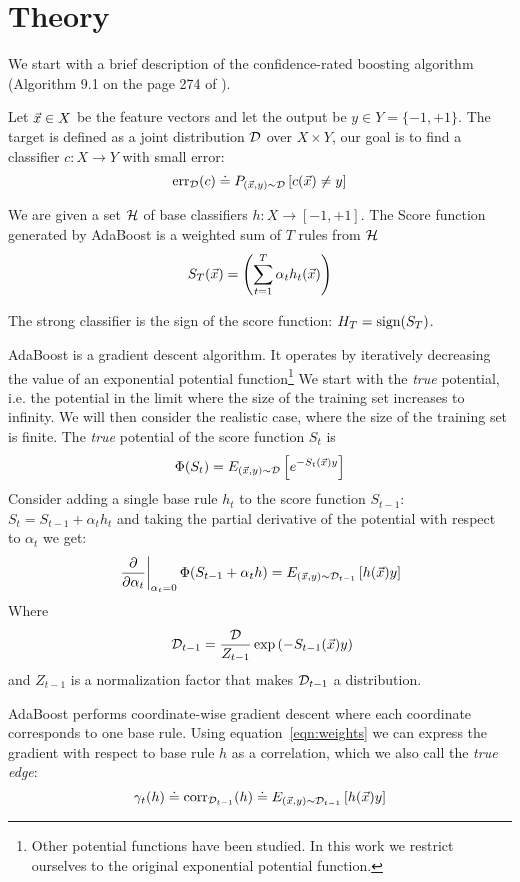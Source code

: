 \section{Theory}\label{sec:theory}
We start with a brief description of the confidence-rated boosting
algorithm (Algorithm 9.1 on the page 274 of \cite{schapire_boosting:_2012}).

Let $\vec{x} \in X$ be the feature vectors and let the output be $y \in
Y= \{-1,+1\}$. The target is defined as a joint distribution ${\cal D}$ over
$X \times Y$, our goal is to find a classifier $c: X \to Y$ with small
error:
$$\mbox{err}_{{\cal D}}(c) \doteq P_{(\vec{x},y)\sim {\cal D}}\left[c(\vec{x}) \neq y \right]$$

We are given a set $\mathcal{H}$ of base classifiers $h:X \to [-1,+1]$. The
Score function generated by AdaBoost is a weighted sum of $T$ rules from
$\mathcal{H}$
\[
S_T(\vec{x}) = \left( \sum_{t=1}^T \alpha_t h_t(\vec{x}) \right)
\]

The strong classifier is the sign of the score function: $H_T =
\mbox{sign}(S_T)$.  

AdaBoost is a gradient descent algorithm. It operates by iteratively
decreasing the value of an exponential potential function\footnote{Other
  potential functions have been studied. In this work we restrict
  ourselves to the original exponential potential function.}  We start
with the {\em true} potential, i.e. the potential in the limit where
the size of the training set increases to infinity. We will then
consider the realistic case, where the size of the training set is
finite.  The {\em true} potential of the score function $S_t$ is
\[
\Phi(S_t) = E_{(\vec{x},y) \sim {\cal D}}\left[e^{-S_t(\vec{x})y} \right]
\]
Consider adding a single base rule $h_t$ to the score function
$S_{t-1}$:
$S_t=S_{t-1}+\alpha_t h_t$ and taking the partial derivative of the potential with respect
to $\alpha_t$ we get:
\begin{equation} \label{eqn:weights}
\left. \frac{\partial}{\partial \alpha_t}\right|_{\alpha_t=0} \Phi(S_{t-1}+\alpha_t h)
= E_{(\vec{x},y) \sim {\cal D}_{t-1}}\left[h(\vec{x}) y \right]
\end{equation}
Where
\begin{equation} ~\label{eqn:Dt}
{\cal D}_{t-1} = \frac{{\cal D}}{Z_{t-1}} \exp\left( -S_{t-1}(\vec{x})y \right)
\end{equation}
and $Z_{t-1}$ is a normalization factor that makes ${\cal D}_{t-1}$ a
distribution.

AdaBoost performs coordinate-wise gradient descent where each
coordinate corresponds to one base rule. Using
equation~\ref{eqn:weights} we can express the gradient with respect to
base rule $h$ as a correlation, which we also call the {\em true edge}: 
\begin{equation} \label{eqn:true-edge}
\gamma_{t}(h) \doteq \mbox{corr}_{{\cal D}_{t-1}}(h) \doteq E_{(\vec{x},y) \sim {\cal D}_{t-1}}\left[h(\vec{x}) y \right]
\end{equation}

